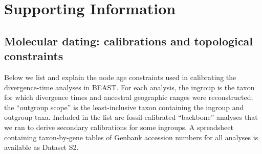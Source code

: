 \section*{Supporting Information}

\subsection*{Molecular dating: calibrations and topological constraints}






Below we list and explain the node age constraints used in calibrating
the divergence-time analyses in BEAST. For each analysis, the ingroup
is the taxon for which divergence times and ancestral geographic
ranges were reconstructed; the ``outgroup scope'' is the
least-inclusive taxon containing the ingroup and outgroup
taxa. Included in the list are fossil-calibrated ``backbone'' analyses
that we ran to derive secondary calibrations for some ingroups. A
spreadsheet containing taxon-by-gene tables of Genbank accession
numbers for all analyses is available as Dataset S2.

